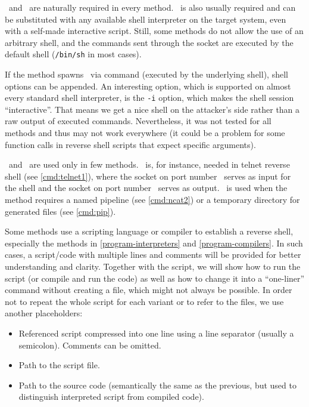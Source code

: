 \host\ and \port\ are naturally required in every method. \shell\ is also usually required and can be substituted with any available shell interpreter on the target system, even with a self-made interactive script. Still, some methods do not allow the use of an arbitrary shell, and the commands sent through the socket are executed by the default shell (\texttt{/bin/sh} in most cases).

If the method spawns \shell\ via command (executed by the underlying shell), shell options can be appended. An interesting option, which is supported on almost every standard shell interpreter, is the \texttt{-i} option, which makes the shell session ``interactive''. That means we get a nice shell on the attacker's side rather than a raw output of executed commands. Nevertheless, it was not tested for all methods and thus may not work everywhere (it could be a problem for some function calls in reverse shell scripts that expect specific arguments).

\portt\ and \tmp\ are used only in few methods. \portt\ is, for instance, needed in telnet reverse shell (see \cref{cmd:telnet1}), where the socket on port number \port\ serves as input for the shell and the socket on port number \portt\ serves as output. \tmp\ is used when the method requires a named pipeline (see \cref{cmd:ncat2}) or a temporary directory for generated files (see \cref{cmd:pip}).

Some methods use a scripting language or compiler to establish a reverse shell, especially the methods in \cref{program-interpreters} and \cref{program-compilers}. In such cases, a script/code with multiple lines and comments will be provided for better understanding and clarity. Together with the script, we will show how to run the script (or compile and run the code) as well as how to change it into a ``one-liner'' command without creating a file, which might not always be possible. In order not to repeat the whole script for each variant or to refer to the files, we use another placeholders:

\setlength{\leftmargini}{10em}
\begin{itemize}
\item[\script] Referenced script compressed into one line using a line separator (usually a semicolon). Comments can be omitted.
\item[\scriptfile] Path to the script file.
\item[\codefile] Path to the source code (semantically the same as the previous, but used to distinguish interpreted script from compiled code).
\end{itemize}
\setlength{\leftmargini}{2.5em}

